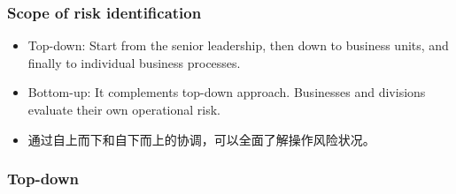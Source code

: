 \subsubsection{Scope of risk identification}
\begin{itemize}
\item Top-down: Start from the senior leadership, then down to business units, and finally to individual business processes.
\item Bottom-up: It complements top-down approach. Businesses and divisions evaluate their own operational risk.
\item 通过自上而下和自下而上的协调，可以全面了解操作风险状况。
\end{itemize}




\subsubsection{Top-down}

